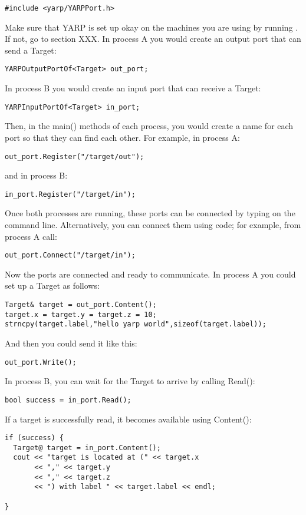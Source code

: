 \begin{verbatim}
#include <yarp/YARPPort.h>
\end{verbatim}
%
Make sure that YARP is set up okay on the machines you are using by 
running .  If not, go to section XXX.
%
In process A you would create an output port that can send a Target:
%
\begin{verbatim}
YARPOutputPortOf<Target> out_port;
\end{verbatim}
%
%
In process B you would create an input port that can receive a Target:
%
\begin{verbatim}
YARPInputPortOf<Target> in_port;
\end{verbatim}
%
Then, in the main() methods of each process, you would create a name
for each port so that they can find each other.  For example, in
process A:
%
\begin{verbatim}
out_port.Register("/target/out");
\end{verbatim}
%
and in process B:
%
\begin{verbatim}
in_port.Register("/target/in");
\end{verbatim}
%
Once both processes are running, these ports can be connected by
typing  on the command line.
Alternatively, you can connect them using code; for example, from
process A call:
%
\begin{verbatim}
out_port.Connect("/target/in");
\end{verbatim}
%
Now the ports are connected and ready to communicate.  In process A
you could set up a Target as follows:
%
\begin{verbatim}
Target& target = out_port.Content();
target.x = target.y = target.z = 10;
strncpy(target.label,"hello yarp world",sizeof(target.label));
\end{verbatim}
%
And then you could send it like this:
%
\begin{verbatim}
out_port.Write();
\end{verbatim}
%
In process B, you can wait for the Target to arrive by calling Read():
%
\begin{verbatim}
bool success = in_port.Read();
\end{verbatim}
%
If a target is successfully read, it becomes available using Content():
%
\begin{verbatim}
if (success) {
  Target@ target = in_port.Content();
  cout << "target is located at (" << target.x
       << "," << target.y
       << "," << target.z
       << ") with label " << target.label << endl;

}
\end{verbatim}


